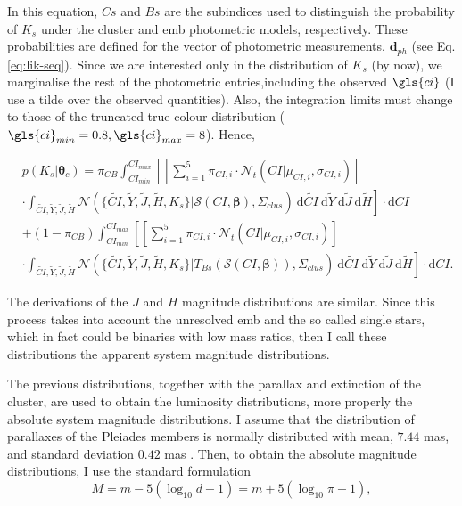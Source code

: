 In this equation, $Cs$ and $Bs$ are the subindices used to distinguish the probability of $K_s$ under the cluster and \gls{emb} photometric models, respectively. These probabilities are defined for the vector of photometric measurements, $\boldsymbol{d}_{ph}$ (see Eq. \ref{eq:lik-seq}). Since we are interested only in the distribution of $K_s$ (by now), we marginalise the rest of the photometric entries,including the observed $\gls{ci}$ (I use a tilde over the observed quantities). Also, the integration limits must change to those of the truncated true colour distribution ($\gls{ci}_{min}=0.8, \gls{ci}_{max}=8$). Hence,

\begin{align}
&p(K_s | \boldsymbol{\theta}_c)  =   \pi_{CB} \int_{CI_{min}}^{CI_{max}}\left[ \left[\sum_{i=1}^5 \pi_{CI,i} \cdot \mathcal{N}_t(CI| \mu_{CI,i},\sigma_{CI,i})\right]\right. \nonumber \\
&\cdot  \left.\int_{\tilde{CI},\tilde{Y},\tilde{J},\tilde{H}}\mathcal{N}(\{\tilde{CI},\tilde{Y},\tilde{J},\tilde{H},K_s\}|\boldsymbol{\mathcal{S}}(CI, \boldsymbol{\beta}),\Sigma_{clus})~\mathrm{d}\tilde{CI}~\mathrm{d}\tilde{Y}~\mathrm{d}\tilde{J}~\mathrm{d}\tilde{H}\right] \cdot \mathrm{d}CI \nonumber \\
& + (1-\pi_{CB}) \int_{CI_{min}}^{CI_{max}}\left[\left[\sum_{i=1}^5 \pi_{CI,i} \cdot \mathcal{N}_t(CI| \mu_{CI,i},\sigma_{CI,i})\right]\right.\nonumber\\
&\cdot \left. \int_{\tilde{CI},\tilde{Y},\tilde{J},\tilde{H}}\mathcal{N}(\{\tilde{CI},\tilde{Y},\tilde{J},\tilde{H},K_s\}|T_{Bs}(\boldsymbol{\mathcal{S}}(CI, \boldsymbol{\beta})),\Sigma_{clus})~\mathrm{d}\tilde{CI}~\mathrm{d}\tilde{Y}~\mathrm{d}\tilde{J}~\mathrm{d}\tilde{H}\right]\cdot \mathrm{d}CI. \nonumber 
\end{align}

The derivations of the $J$ and $H$ magnitude distributions are similar. Since this process takes into account the unresolved \gls{emb} and the so called single stars, which in fact could be binaries with low mass ratios, then I call these distributions the apparent system magnitude distributions. 

The previous distributions, together with the parallax and extinction of the cluster, are used to obtain the luminosity distributions, more properly the absolute system magnitude distributions. I assume that the distribution of parallaxes of the Pleiades members is normally distributed with mean, $7.44$ mas, and standard deviation $0.42$ mas \citep{Galli2017}. Then, to obtain the absolute magnitude distributions, I use the standard formulation
\begin{equation}
M = m - 5(\log_{10}{d} +1) = m + 5(\log_{10}\pi +1),\nonumber
\end{equation}

